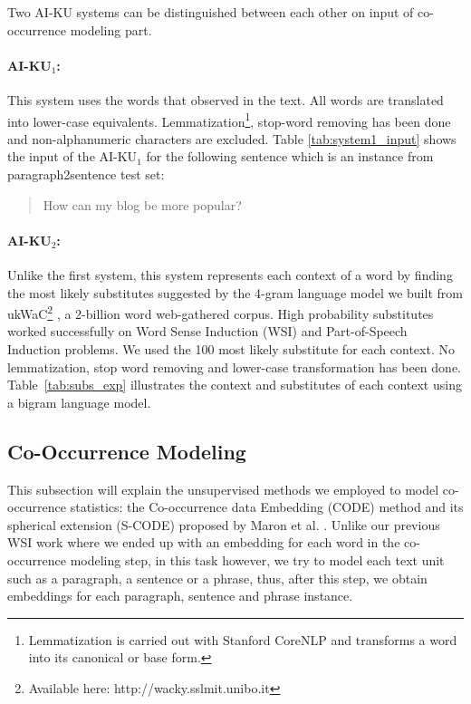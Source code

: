 \documentclass[11pt]{article}
\begin{document}
Two AI-KU systems can be distinguished between each other on input of co-occurrence modeling part. 

\paragraph{AI-KU$_1$:} This system uses the words that observed in the text. All words are translated into lower-case equivalents. Lemmatization\footnote{Lemmatization is carried out with Stanford CoreNLP and transforms a word into its canonical or base form.}, stop-word removing has been done and non-alphanumeric characters are excluded. Table \ref{tab:system1_input} shows the input of the AI-KU$_1$ for the following sentence which is an instance from paragraph2sentence test set:

\begin{quote}
How can my blog be more popular?
\end{quote}



\paragraph{AI-KU$_2$:} Unlike the first system, this system represents each context of a word by finding the most likely substitutes suggested by the 4-gram language model we built from ukWaC\footnote{Available here: http://wacky.sslmit.unibo.it} \cite{ukWaC}, a 2-billion word web-gathered corpus. High probability substitutes worked successfully on Word Sense Induction (WSI) \cite{baskaya13ai} and Part-of-Speech Induction \cite{yatbaz2012learning} problems. We used the 100 most likely substitute for each context. No lemmatization, stop word removing and lower-case transformation has been done. Table~\ref{tab:subs_exp} illustrates the context and substitutes of each context using a bigram language model.



\subsection{Co-Occurrence Modeling}

This subsection will explain the unsupervised methods we employed to model co-occurrence statistics: the Co-occurrence data Embedding (CODE) method \cite{globerson-CODE} and its spherical extension (S-CODE) proposed by Maron et al. . Unlike our previous WSI work \cite{baskaya13ai} where we ended up with an embedding for each
word in the co-occurrence modeling step, in this task however, we try to model each text unit such as a paragraph, a sentence or a phrase, thus, after this step, we obtain embeddings for each paragraph, sentence and phrase instance. 
\end{document}
